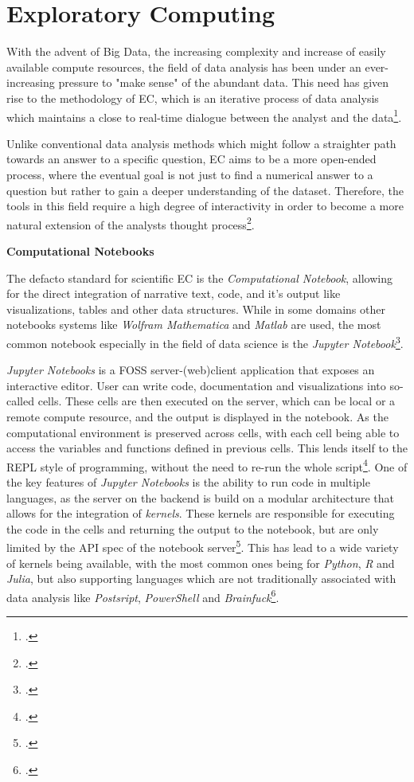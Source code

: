 \section{Exploratory Computing}
\label{sec:EC}

With the advent of Big Data, the increasing complexity and increase of easily available 
compute resources, the field of data analysis has been under an ever-increasing pressure 
to "make sense" of the abundant data.
This need has given rise to the methodology of \acf{EC}, which is an iterative 
process of data analysis which maintains a close to real-time dialogue between the
analyst and the data\footcite{diblasExploratoryComputingDraft2014}.

Unlike conventional data analysis methods which might follow a straighter path towards
an answer to a specific question, \ac{EC} aims to be a more open-ended process, where the eventual goal is
not just to find a numerical answer to a question but rather to gain a deeper understanding of the dataset.
Therefore, the tools in this field require a high degree of interactivity in order to
become a more natural extension of the analysts thought process\footcite{grangerJupyterThinkingStorytelling2021}.

\textbf{Computational Notebooks}

The defacto standard for scientific \ac{EC} is the \textit{Computational Notebook},
allowing for the direct integration of narrative text, code, and it's output like visualizations, tables and other data structures.
While in some domains other notebooks systems like \textit{Wolfram Mathematica} and \textit{Matlab} are used,
the most common notebook especially in the field of data science is the \textit{Jupyter Notebook}\footcite{perkelWhyJupyterData2018}.

\textit{Jupyter Notebooks} is a \ac{FOSS} server-(web)client application that exposes 
an interactive editor.
User can write code, documentation and visualizations into so-called cells. 
These cells are then executed on the server, which can be local or a remote compute resource,
and the output is displayed in the notebook.
As the computational environment is preserved across cells, 
with each cell being able to access the variables and functions defined in previous cells.
This lends itself to the \ac{REPL} style of programming, without the need to re-run the whole script\footcite{jupyter-docsProjectJupyterDocumentation}.
One of the key features of \textit{Jupyter Notebooks} is the ability to run code in multiple languages,
as the server on the  backend is build on a modular architecture that allows for the integration of \textit{kernels}.
These kernels are responsible for executing the code in the cells and returning the output to the notebook,
but are only limited by the \ac{API} spec of the notebook server\footcite{jupyter-docsArchitectureJupyterDocumentation}.
This has lead to a wide variety of kernels being available, with the most common ones being for \textit{Python}, \textit{R} and \textit{Julia},
but also supporting languages which are not traditionally associated with data analysis like \textit{Postsript}, \textit{PowerShell} and \textit{Brainfuck}\footcite{jupyter-docsJupyterKernels}. 

\pagebreak
